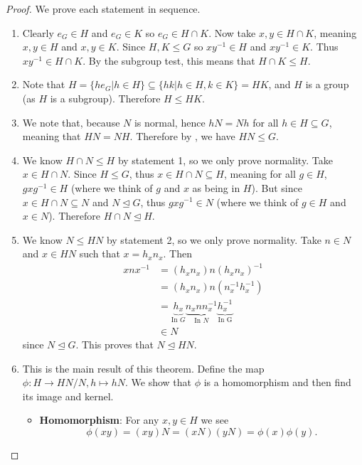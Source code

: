 \begin{proof}
    We prove each statement in sequence.

    \begin{enumerate}
        \item Clearly $e_G \in H$ and $e_G \in K$ so $e_G \in H \cap K$. Now take $x, y \in H \cap K$, meaning $x, y \in H$ and $x, y \in K$. Since $H, K \leq G$ so $xy^{-1} \in H$ and $xy^{-1} \in K$. Thus $xy^{-1} \in H \cap K$. By the subgroup test, this means that $H \cap K \leq H$.

        \item Note that $H = \{he_G \vert h \in H\} \subseteq \{hk \vert h \in H, k \in K\} = HK$, and $H$ is a group (as $H$ is a subgroup). Therefore $H \leq HK$.

        \item We note that, because $N$ is normal, hence $hN = Nh$ for all $h \in H \subseteq G$, meaning that $HN = NH$. Therefore by , we have $HN \leq G$.

        \item We know $H \cap N \leq H$ by statement 1, so we only prove normality. Take $x \in H \cap N$. Since $H \leq G$, thus $x \in H \cap N \subseteq H$, meaning for all $g \in H$, $gxg^{-1} \in H$ (where we think of $g$ and $x$ as being in $H$). But since $x \in H \cap N \subseteq N$ and $N \unlhd G$, thus $gxg^{-1} \in N$ (where we think of $g \in H$ and $x \in N$). Therefore $H \cap N \unlhd H$.

        \item We know $N \leq HN$ by statement 2, so we only prove normality. Take $n \in N$ and $x \in HN$ such that $x = h_xn_x$. Then
        \begin{align*}
            xnx^{-1} &= (h_xn_x)n(h_xn_x)^{-1}\\
            &= (h_xn_x)n(n_x^{-1}h_x^{-1})\\
            &= \underbrace{h_x}_{\text{In }G}\underbrace{n_xnn_x^{-1}}_{\text{In }N}\underbrace{h_x^{-1}}_{\text{In G}}\\
            &\in N
        \end{align*}
        since $N \unlhd G$. This proves that $N \unlhd HN$.

        \item This is the main result of this theorem. Define the map $\phi: H \to HN/N, h \mapsto hN$. We show that $\phi$ is a homomorphism and then find its image and kernel.
        \begin{itemize}
            \item \textbf{Homomorphism}: For any $x, y \in H$ we see
            \[
                \phi(xy) = (xy)N = (xN)(yN) = \phi(x)\phi(y).
            \]


\end{itemize}
\end{enumerate}
\end{proof}
